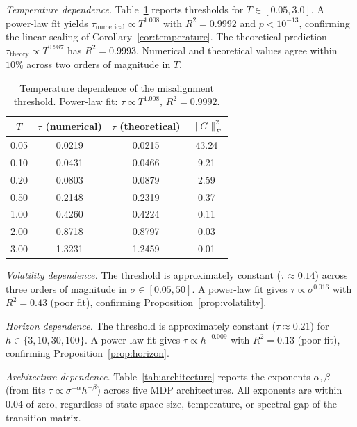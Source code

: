 \emph{Temperature dependence.}
Table~\ref{tab:temperature} reports thresholds for $T \in [0.05, 3.0]$.
A power-law fit yields $\tau_{\mathrm{numerical}} \propto T^{1.008}$ with
$R^2 = 0.9992$ and $p < 10^{-13}$, confirming the linear scaling of
Corollary~\ref{cor:temperature}. The theoretical prediction
$\tau_{\mathrm{theory}} \propto T^{0.987}$ has $R^2 = 0.9993$. Numerical
and theoretical values agree within $10\%$ across two orders of magnitude
in $T$.

\begin{table}[ht]
\centering
\caption{Temperature dependence of the misalignment threshold. Power-law
  fit: $\tau \propto T^{1.008}$, $R^2 = 0.9992$.}\label{tab:temperature}
\begin{tabular}{@{}cccc@{}}
\toprule
$T$ & $\tau$ (numerical) & $\tau$ (theoretical) & $\lVert G \rVert_F^2$ \\
\midrule
0.05 & 0.0219 & 0.0215 & 43.24 \\
0.10 & 0.0431 & 0.0466 & 9.21 \\
0.20 & 0.0803 & 0.0879 & 2.59 \\
0.50 & 0.2148 & 0.2319 & 0.37 \\
1.00 & 0.4260 & 0.4224 & 0.11 \\
2.00 & 0.8718 & 0.8797 & 0.03 \\
3.00 & 1.3231 & 1.2459 & 0.01 \\
\bottomrule
\end{tabular}
\end{table}

\emph{Volatility dependence.}
The threshold is approximately constant ($\tau \approx 0.14$) across three
orders of magnitude in $\sigma \in [0.05, 50]$. A power-law fit gives
$\tau \propto \sigma^{0.016}$ with $R^2 = 0.43$ (poor fit), confirming
Proposition~\ref{prop:volatility}.

\emph{Horizon dependence.}
The threshold is approximately constant ($\tau \approx 0.21$) for
$h \in \{3, 10, 30, 100\}$. A power-law fit gives
$\tau \propto h^{-0.009}$ with $R^2 = 0.13$ (poor fit), confirming
Proposition~\ref{prop:horizon}.

\emph{Architecture dependence.}
Table~\ref{tab:architecture} reports the exponents $\alpha, \beta$ (from
fits $\tau \propto \sigma^{-\alpha} h^{-\beta}$) across five MDP
architectures. All exponents are within $0.04$ of zero, regardless of
state-space size, temperature, or spectral gap of the transition matrix.

